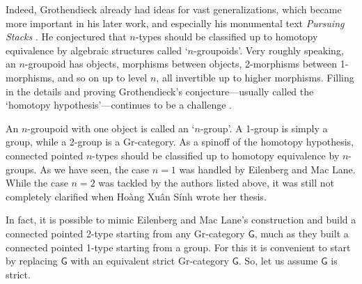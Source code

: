 \documentclass[reqno]{amsart}
\newcommand{\G}{{\mathsf{G}}}   %
\theoremstyle{definition}
\begin{document}
Indeed, Grothendieck already had ideas for vast generalizations, which became more important in his later work, and especially his monumental text
\textsl{Pursuing Stacks} \cite{G84}.  He conjectured that $n$-types should be classified up to homotopy equivalence by algebraic structures called `$n$-groupoids'.  Very roughly speaking, an $n$-groupoid has objects, morphisms between objects, 2-morphisms between 1-morphisms, and so on up to level $n$, all invertible up to higher morphisms.   Filling in the details and proving Grothendieck's conjecture---usually called the `homotopy hypothesis'---continues to be a challenge \cite{HL19}.

An $n$-groupoid with one object is called an `$n$-group'.   A 1-group is simply a group, while a 2-group is a Gr-category.  As a spinoff of the homotopy hypothesis, connected pointed $n$-types should be classified up to homotopy equivalence by $n$-groups.   As we have seen, the case $n = 1$ was handled by Eilenberg and Mac Lane.  While the case $n = 2$ was tackled by the authors listed above, it was still not completely clarified when Ho\`ang Xu\^an S\'inh wrote her thesis.  

In fact, it is possible to mimic Eilenberg and Mac Lane's construction and build a connected pointed 2-type starting from any Gr-category $\G$, much as they built a connected pointed 1-type starting from a group.  For this it is convenient to start by replacing $\G$ with an equivalent strict Gr-category $\G$.   So, let us assume $\G$ is strict.  
\end{document}
